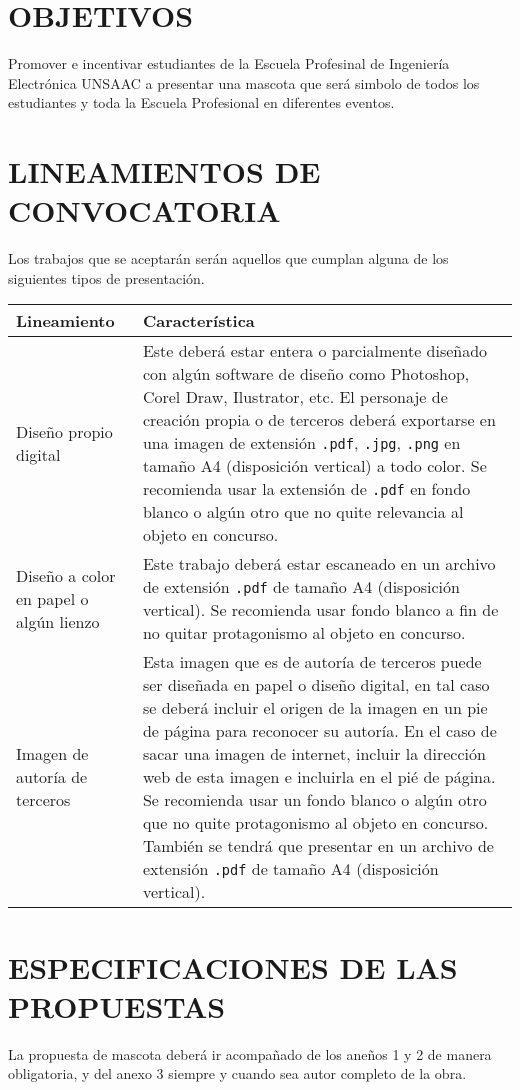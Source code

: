 \documentclass{article}
\begin{document}
\section{OBJETIVOS}

Promover e incentivar estudiantes de la Escuela Profesinal de Ingeniería Electrónica UNSAAC a presentar una mascota que será simbolo de todos los estudiantes y toda la Escuela Profesional en diferentes eventos.

\section{LINEAMIENTOS DE CONVOCATORIA}

Los trabajos que se aceptarán serán aquellos que cumplan alguna de los siguientes tipos de presentación.


\begin{tabular}{|p{5cm}|p{10cm}|}
\hline
\textbf{Lineamiento} & \textbf{Característica} \\ \hline
Diseño propio digital & Este deberá estar entera o parcialmente diseñado con algún software de diseño como Photoshop, Corel Draw, Ilustrator, etc. El personaje de creación propia o de terceros deberá exportarse en una imagen de extensión \texttt{.pdf}, \texttt{.jpg}, \texttt{.png} en tamaño A4 (disposición vertical) a todo color. Se recomienda usar la extensión de \texttt{.pdf} en fondo blanco o algún otro que no quite relevancia al objeto en concurso.\\ \hline
Diseño a color en papel o algún lienzo & Este trabajo deberá estar escaneado en un archivo de extensión \texttt{.pdf} de tamaño A4 (disposición vertical). Se recomienda usar fondo blanco a fin de no quitar protagonismo al objeto en concurso.  \\ \hline
Imagen de autoría de terceros &  Esta imagen que es de autoría de terceros puede ser diseñada en papel o diseño digital, en tal caso se deberá incluir el origen de la imagen en un pie de página para reconocer su autoría. En el caso de sacar una imagen de internet, incluir la dirección web de esta imagen e incluirla en el pié de página. Se recomienda usar un fondo blanco o algún otro que no quite protagonismo al objeto en concurso. También se tendrá que presentar en un archivo de extensión \texttt{.pdf} de tamaño A4 (disposición vertical).  \\ \hline
\end{tabular}

\section{ESPECIFICACIONES DE LAS PROPUESTAS}
La propuesta de mascota deberá ir acompañado de los aneños 1 y 2 de manera obligatoria, y del anexo 3 siempre y cuando sea autor completo de la obra.
 
\end{document}
